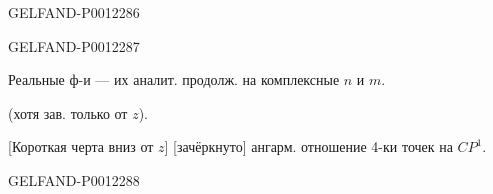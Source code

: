 \begin{GelfandAdjacentEvidence}{GELFAND-P001228}{6}

\end{GelfandAdjacentEvidence}
\begin{GelfandAdjacentEvidence}{GELFAND-P001228}{7}


Реальные ф-и --- их аналит. продолж. на комплексные \(n\) и \(m\).

 (хотя зав. только от \(z\)).

[Короткая черта вниз от \(z\)] [зачёркнуто] ангарм. отношение 4-ки точек на \(CP^1\).
\end{GelfandAdjacentEvidence}
\begin{GelfandAdjacentEvidence}{GELFAND-P001228}{8}

\end{GelfandAdjacentEvidence}



